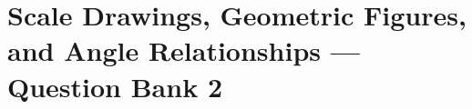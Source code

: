 \documentclass[12pt, fleqn, openany, oneside]{studyGuide}
\begin{document}

\chapter{Scale Drawings, Geometric Figures, and Angle Relationships — Question Bank 2}
















\printAnswerKey
\end{document}
